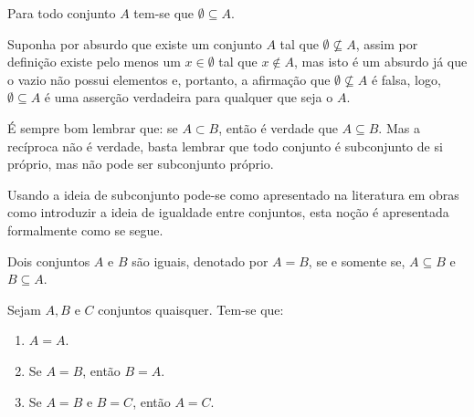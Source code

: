 \begin{teorema}\label{teo:ConjuntoVazioSubDeTodos}
	Para todo conjunto $A$ tem-se que $\emptyset \subseteq A$.
\end{teorema}

\begin{prova}
	Suponha por absurdo que existe um conjunto $A$ tal que $\emptyset \not\subseteq A$, assim por definição  existe pelo menos um $x \in \emptyset$ tal que $x \notin A$, mas isto é um absurdo já que o vazio não possui elementos e, portanto, a afirmação que $\emptyset \not\subseteq A$ é falsa, logo, $\emptyset \subseteq A$ é uma asserção verdadeira para qualquer que seja o $A$.
\end{prova}


\begin{atencao}\label{tips:SobreInclusaoConjunto}
 É sempre bom lembrar que: se $A \subset B$, então é verdade que $A \subseteq B$. Mas a recíproca não é verdade, basta lembrar que todo conjunto é subconjunto de si próprio, mas não pode ser subconjunto próprio.
\end{atencao}

Usando a ideia de subconjunto pode-se como apresentado na literatura em obras como \cite{abe1991-TC, halmos2001, lipschutz1978-TC} introduzir a ideia de igualdade entre conjuntos, esta noção é apresentada formalmente como se segue.

\begin{definicao}\label{def:IgualdadeConjuntos}
  \cite{abe1991-TC} Dois conjuntos $A$ e $B$ são iguais, denotado por $A = B$, se e somente se, $A \subseteq B$ e $B \subseteq A$.
\end{definicao}

\begin{teorema}
	Sejam $A, B$ e $C$ conjuntos quaisquer. Tem-se que:
	\begin{enumerate}
		\item $A = A$.
		\item Se $A = B$, então $B = A$.
		\item Se $A = B$ e $B = C$, então $A = C$.
	\end{enumerate}
\end{teorema}

